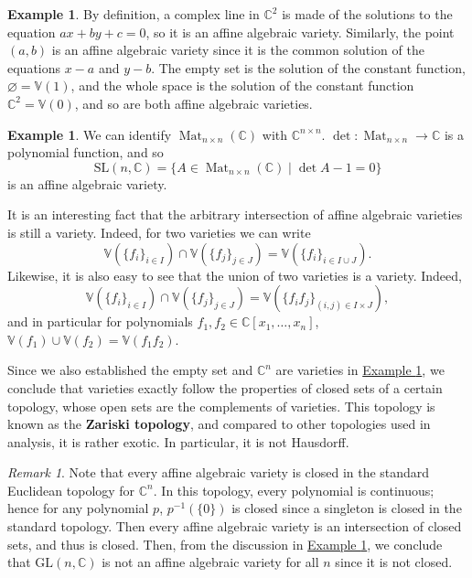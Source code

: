 \documentclass[letterpaper]{article}
\theoremstyle{definition}
\newtheorem{example}[theorem]{Example}
\theoremstyle{remark}
\newtheorem{remark}[theorem]{Remark}
\newcommand\CC{\mathbb{C}}
\newcommand\VV{\mathbb{V}}
\newcommand{\GL}{\mathrm{GL}}
\newcommand{\SL}{\mathrm{SL}}
\DeclareMathOperator{\Mat}{Mat}
\begin{document}
\begin{example}\label{ex:varieties}
	By definition, a complex line in \(\CC^2\) is made of the solutions to the equation \(ax+by+c=0\), so it is an affine algebraic variety. Similarly, the point \((a,b)\) is an affine algebraic variety since it is the common solution of the equations \(x-a\) and \(y-b\). The empty set is the solution of the constant function, $\varnothing=\VV(1)$, and the whole space is the solution of the constant function $\CC^2=\VV(0)$, and so are both affine algebraic varieties.
\end{example}
\begin{example}\label{ex:matrix}
    We can identify $\Mat_{n\times n}(\CC)$ with $\CC^{n\times n}$. $\det:\Mat_{n\times n}\to \CC$ is a polynomial function, and so \[\SL(n,\CC)=\{A\in\Mat_{n\times n}(\CC)\mid \det A-1=0\}\] is an affine algebraic variety. 
\end{example}

It is an interesting fact that the arbitrary intersection of affine algebraic varieties is still a variety. Indeed, for two varieties we can write 
\[\VV(\{f_i\}_{i\in I})\cap \VV(\{f_j\}_{j\in J})=\VV(\{f_i\}_{i\in I\cup J}).\]
Likewise, it is also easy to see that the union of two varieties is a variety. Indeed, 
\[\VV(\{f_i\}_{i\in I})\cap \VV(\{f_j\}_{j\in J})=\VV(\{f_if_j\}_{(i,j)\in I\times J}), \] and in particular for polynomials \(f_1,f_2\in\CC[x_1,\dots,x_n]\), \(\VV(f_1)\cup\VV(f_2)=\VV(f_1f_2)\). 

Since we also established the empty set and \(\CC^n\) are varieties in \hyperref[ex:varieties]{Example \ref*{ex:varieties}}, we conclude that varieties exactly follow the properties of closed sets of a certain topology, whose open sets are the complements of varieties. This topology is known as the \textbf{Zariski topology}, and compared to other topologies used in analysis, it is rather exotic. In particular, it is not Hausdorff. 

\begin{remark}
	Note that every affine algebraic variety is closed in the standard Euclidean topology for $\CC^n$. In this topology, every polynomial is continuous; hence for any polynomial $p$, $p^{-1}(\{0\})$ is closed since a singleton is closed in the standard topology. Then every affine algebraic variety is an intersection of closed sets, and thus is closed. Then, from the discussion in \hyperref[ex:matrix]{Example \ref*{ex:matrix}}, we conclude that $\GL(n,\CC)$ is not an affine algebraic variety for all $n$ since it is not closed. 
\end{remark}
\end{document}
